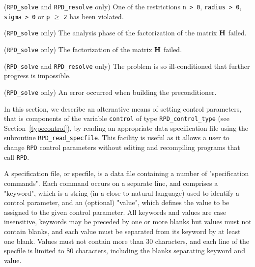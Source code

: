 \documentclass{galahad}
\newcommand{\packagename}{RPD}
\begin{document}
\begin{description}
\begin{description}
 ({\tt \packagename\_solve} and
{\tt \packagename\_resolve} only)
One of the restrictions
{\tt n > 0},
{\tt radius > 0},
{\tt sigma > 0}
or
{\tt p} $\geq$ {\tt 2}
has been violated.

 ({\tt \packagename\_solve} only)
The analysis phase of the factorization of the matrix ${\mathbf{H}}$ failed.

 ({\tt \packagename\_solve} only)
The factorization of the matrix ${\mathbf{H}}$ failed.

 ({\tt \packagename\_solve} and
{\tt \packagename\_resolve} only)
The problem is so ill-conditioned that further progress is impossible.

 ({\tt \packagename\_solve} only)
 An error occurred when building the preconditioner.

\end{description}


\galfeatures
\noindent In this section, we describe an alternative means of setting
control parameters, that is components of the variable {\tt control} of type
{\tt \packagename\_control\_type}
(see Section~\ref{typecontrol}),
by reading an appropriate data specification file using the
subroutine {\tt \packagename\_read\_specfile}. This facility
is useful as it allows a user to change  {\tt \packagename} control parameters
without editing and recompiling programs that call {\tt \packagename}.

A specification file, or specfile, is a data file containing a number of
"specification commands". Each command occurs on a separate line,
and comprises a "keyword",
which is a string (in a close-to-natural language) used to identify a
control parameter, and
an (optional) "value", which defines the value to be assigned to the given
control parameter. All keywords and values are case insensitive,
keywords may be preceded by one or more blanks but
values must not contain blanks, and
each value must be separated from its keyword by at least one blank.
Values must not contain more than 30 characters, and
each line of the specfile is limited to 80 characters,
including the blanks separating keyword and value.


\end{description}
\end{document}
